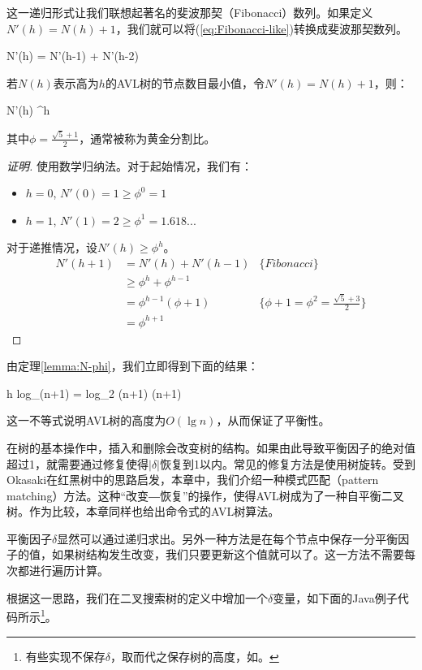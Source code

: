 \documentclass[UTF8]{article}
\begin{document}
这一递归形式让我们联想起著名的斐波那契（Fibonacci）数列。如果定义$N'(h) = N(h)+1$，我们就可以将(\ref{eq:Fibonacci-like})转换成斐波那契数列。

\be
  N'(h) = N'(h-1) + N'(h-2)
\ee

\begin{lemma}
\label{lemma:N-phi}
若$N(h)$表示高为$h$的AVL树的节点数目最小值，令$N'(h) = N(h) + 1$，则：

\be
  N'(h) \geq \phi^h
\ee

其中$\phi = \frac{\sqrt{5}+1}{2}$，通常被称为黄金分割比。
\end{lemma}

\begin{proof}[证明]
使用数学归纳法。对于起始情况，我们有：
\begin{itemize}
\item $h=0$, $N'(0) = 1 \geq \phi^0 = 1$
\item $h=1$, $N'(1) = 2 \geq \phi^1 = 1.618...$
\end{itemize}

对于递推情况，设$N'(h) \geq \phi^h$。
\[
  \begin{array}{lll}
  N'(h+1) & = N'(h) + N'(h-1) & \{Fibonacci\} \\
          & \geq \phi^h + \phi^{h-1} & \\
          & = \phi^{h-1}(\phi + 1) & \{\phi + 1 = \phi^2 = \frac{\sqrt{5}+3}{2}\} \\
          & = \phi^{h+1}
 \end{array}
\]
\end{proof}

由定理\ref{lemma:N-phi}，我们立即得到下面的结果：

\be
  h \leq log_{\phi}(n+1) = log_{\phi}2 \cdot \lg (n+1)  \lg (n+1)
  \label{eq:AVL-height}
\ee

这一不等式说明AVL树的高度为$O(\lg n)$，从而保证了平衡性。

在树的基本操作中，插入和删除会改变树的结构。如果由此导致平衡因子的绝对值超过1，就需要通过修复使得$|\delta|$恢复到1以内。常见的修复方法是使用树旋转。受到Okasaki在红黑树\cite{okasaki}中的思路启发，本章中，我们介绍一种模式匹配（pattern matching）方法。这种“改变―恢复”的操作，使得AVL树成为了一种自平衡二叉树。作为比较，本章同样也给出命令式的AVL树算法。

平衡因子$\delta$显然可以通过递归求出。另外一种方法是在每个节点中保存一分平衡因子的值，如果树结构发生改变，我们只要更新这个值就可以了。这一方法不需要每次都进行遍历计算。

根据这一思路，我们在二叉搜索树的定义中增加一个$\delta$变量，如下面的Java例子代码所示\footnote{有些实现不保存$\delta$，取而代之保存树的高度，如\cite{py-avl}。}。
\end{document}
